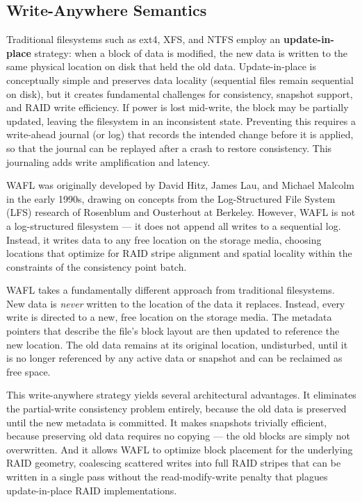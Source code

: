 \subsection{Write-Anywhere Semantics}

Traditional filesystems such as ext4, XFS, and NTFS employ an \textbf{update-in-place} strategy: when a block of data is modified, the new data is written to the same physical location on disk that held the old data. Update-in-place is conceptually simple and preserves data locality (sequential files remain sequential on disk), but it creates fundamental challenges for consistency, snapshot support, and RAID write efficiency. If power is lost mid-write, the block may be partially updated, leaving the filesystem in an inconsistent state. Preventing this requires a write-ahead journal (or log) that records the intended change before it is applied, so that the journal can be replayed after a crash to restore consistency. This journaling adds write amplification and latency.

WAFL was originally developed by David Hitz, James Lau, and Michael Malcolm in the early 1990s, drawing on concepts from the Log-Structured File System (LFS) research of Rosenblum and Ousterhout at Berkeley. However, WAFL is not a log-structured filesystem --- it does not append all writes to a sequential log. Instead, it writes data to any free location on the storage media, choosing locations that optimize for RAID stripe alignment and spatial locality within the constraints of the consistency point batch.

WAFL takes a fundamentally different approach from traditional filesystems. New data is \emph{never} written to the location of the data it replaces. Instead, every write is directed to a new, free location on the storage media. The metadata pointers that describe the file's block layout are then updated to reference the new location. The old data remains at its original location, undisturbed, until it is no longer referenced by any active data or snapshot and can be reclaimed as free space.

This write-anywhere strategy yields several architectural advantages. It eliminates the partial-write consistency problem entirely, because the old data is preserved until the new metadata is committed. It makes snapshots trivially efficient, because preserving old data requires no copying --- the old blocks are simply not overwritten. And it allows WAFL to optimize block placement for the underlying RAID geometry, coalescing scattered writes into full RAID stripes that can be written in a single pass without the read-modify-write penalty that plagues update-in-place RAID implementations.

